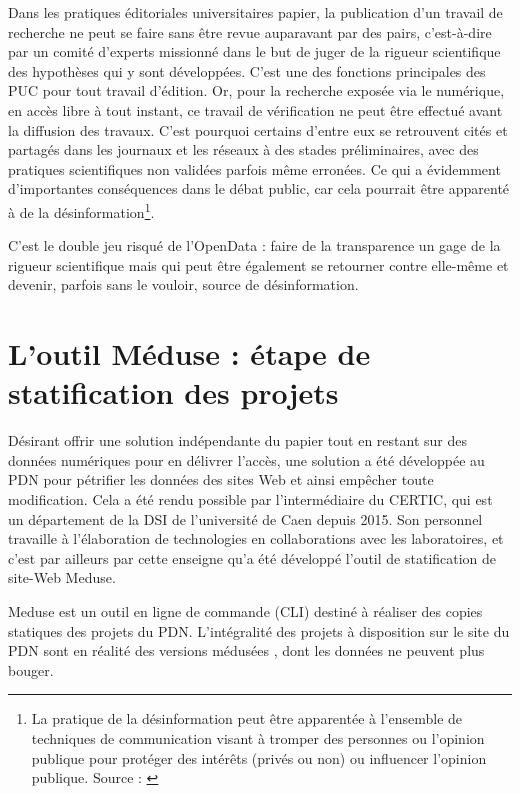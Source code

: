\documentclass[a4paper,12pt,twoside]{book}
\begin{document}
Dans les pratiques éditoriales universitaires papier, la publication d'un travail de recherche ne peut se faire sans être revue auparavant par des pairs, c'est-à-dire par un comité d'experts missionné dans le but de juger de la rigueur scientifique des hypothèses qui y sont développées. C'est une des fonctions principales des \acrshort{PUC} pour tout travail d'édition. Or, pour la recherche exposée via le numérique, en accès libre à tout instant, ce travail de vérification ne peut être effectué avant la diffusion des travaux. C'est pourquoi certains d'entre eux se retrouvent cités et partagés dans les journaux et les réseaux à des stades préliminaires, avec des pratiques scientifiques non validées parfois même erronées. Ce qui a évidemment d'importantes conséquences dans le débat public, car cela pourrait être apparenté à de la désinformation\footnote{La pratique de la désinformation peut être apparentée à l'ensemble de techniques de communication visant à tromper des personnes ou l'opinion publique pour protéger des intérêts (privés ou non) ou influencer l'opinion publique. Source : \cite{desinformation}}.

C'est le double jeu risqué de l'OpenData : faire de la transparence un gage de la rigueur scientifique mais qui peut être également se retourner contre elle-même et devenir, parfois sans le vouloir, source de désinformation.
     
    
 \section{L'outil Méduse : étape de statification des projets}
    
 Désirant offrir une solution indépendante du papier tout en restant sur des données numériques pour en délivrer l'accès, une solution a été développée au \acrshort{PDN} pour \og pétrifier \fg les données des sites Web et ainsi empêcher toute modification. Cela a été rendu possible par l'intermédiaire du \acrfull{CERTIC}, qui est un département de la \acrfull{DSI} de l'université de Caen depuis 2015. Son personnel travaille à l'élaboration de technologies en collaborations avec les laboratoires, et c'est par ailleurs par cette enseigne qu'a été développé l'outil de statification de site-Web Meduse.
    
    
Meduse est un outil en ligne de commande (\acrshort{CLI}) destiné à réaliser des copies statiques des projets du \acrshort{PDN}. L'intégralité des projets à disposition sur le site du \acrshort{PDN} sont en réalité des versions \og médusées \fg, dont les données ne peuvent plus bouger.
\end{document}
